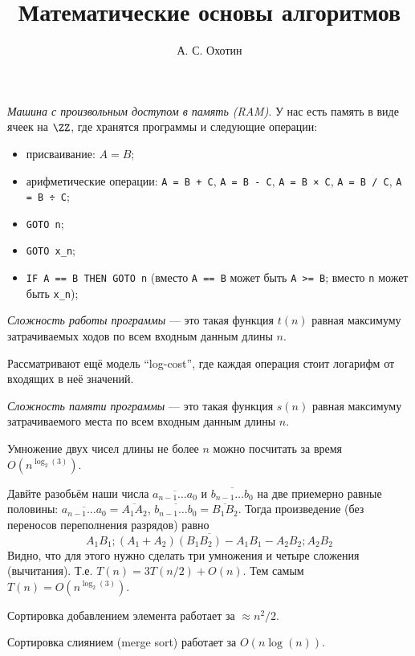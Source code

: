 \documentclass[12pt,a4paper]{article}
\title{Математические основы алгоритмов}
\author{А. С. Охотин}
\date{}
\begin{document}
    \maketitle

    \begin{definition}
        \emph{Машина с произвольным доступом в память (RAM)}. У нас есть память в виде ячеек на $\ZZ$, где хранятся программы и следующие операции:
        \begin{itemize}
            \item присваивание: $A = B$;
            \item арифметические операции: \verb|A = B + C|, \verb|A = B - C|, \verb|A = B × C|, \verb|A = B / C|, \verb|A = B ÷ C|;
            \item \verb|GOTO n|;
            \item \verb|GOTO x_n|;
            \item \verb|IF A == B THEN GOTO n| (вместо \verb|A == B| может быть \verb|A >= B|; вместо \verb|n| может быть \verb|x_n|); 
        \end{itemize}
    \end{definition}

    \begin{definition}
        \emph{Сложность работы программы} --- это такая функция $t(n)$ равная максимуму затрачиваемых ходов по всем входным данным длины $n$.
    \end{definition}

    \begin{remark}
        Рассматривают ещё модель ``log-cost'', где каждая операция стоит логарифм от входящих в неё значений.
    \end{remark}

    \begin{definition}
        \emph{Сложность памяти программы} --- это такая функция $s(n)$ равная максимуму затрачиваемого места по всем входным данным длины $n$.
    \end{definition}

    \begin{theorem}[Карацуба]
        Умножение двух чисел длины не более $n$ можно посчитать за время $O(n^{\log_2(3)})$.
    \end{theorem}

    \begin{theorem}
        Давйте разобьём наши числа $\overline{a_{n-1}\dots a_0}$ и $\overline{b_{n-1}\dots b_0}$ на две приемерно равные половины: $\overline{a_{n-1}\dots a_0} = \overline{A_1A_2}$, $\overline{b_{n-1}\dots b_0} = \overline{B_1B_2}$. Тогда произведение (без переносов переполнения разрядов) равно
        \[\overline{A_1B_1;(A_1+A_2)(B_1B_2)-A_1B_1-A_2B_2;A_2B_2}\]
        Видно, что для этого нужно сделать три умножения и четыре сложения (вычитания). Т.е. $T(n) = 3 T(n/2) + O(n)$. Тем самым $T(n) = O(n^{\log_2(3)})$.
    \end{theorem}

    \begin{theorem}
        Сортировка добавлением элемента работает за $\approx n^2/2$.
    \end{theorem}

    \begin{theorem}
        Сортировка слиянием (merge sort) работает за $O(n\log(n))$.
    \end{theorem}
\end{document}
